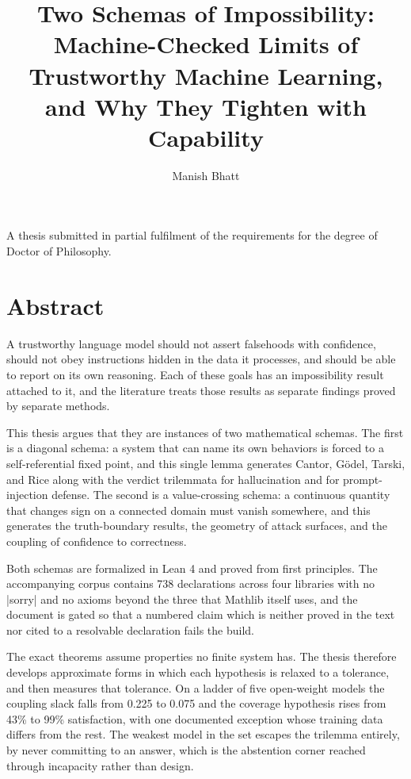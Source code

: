 \documentclass{memoir}
\title{\sffamily Two Schemas of Impossibility: Machine-Checked Limits of Trustworthy Machine Learning, and Why They Tighten with Capability}
\author{\sffamily Manish Bhatt}
\date{\sffamily }
\begin{document}
\frontmatter

\begin{titlingpage}
\maketitle
\end{titlingpage}

\tableofcontents


\cleardoublepage
A thesis submitted in partial fulfilment of the requirements for the degree of
Doctor of Philosophy.

\mainmatter
\chapter{Abstract}\label{Two--Schemas--of--Impossibility-005F-005F-005F--Machine--Checked--Limits--of--Trustworthy--Machine--Learning-005F-005F-005F--and--Why--They--Tighten--with--Capability----Abstract}

A trustworthy language model should not assert falsehoods with confidence,
should not obey instructions hidden in the data it processes, and should be able
to report on its own reasoning. Each of these goals has an impossibility result
attached to it, and the literature treats those results as separate findings
proved by separate methods.

This thesis argues that they are instances of two mathematical schemas. The
first is a diagonal schema: a system that can name its own behaviors is forced
to a self-referential fixed point, and this single lemma generates Cantor,
Gödel, Tarski, and Rice along with the verdict trilemmata for hallucination and
for prompt-injection defense. The second is a value-crossing schema: a
continuous quantity that changes sign on a connected domain must vanish
somewhere, and this generates the truth-boundary results, the geometry of attack
surfaces, and the coupling of confidence to correctness.

Both schemas are formalized in Lean 4 and proved from first principles. The
accompanying corpus contains 738 declarations across four libraries with no
\LeanVerb|sorry| and no axioms beyond the three that Mathlib itself uses, and the
document is gated so that a numbered claim which is neither proved in the text
nor cited to a resolvable declaration fails the build.

The exact theorems assume properties no finite system has. The thesis therefore
develops approximate forms in which each hypothesis is relaxed to a tolerance,
and then measures that tolerance. On a ladder of five open-weight models the
coupling slack falls from 0.225 to 0.075 and the coverage hypothesis rises from
43\% to 99\% satisfaction, with one documented exception whose training data
differs from the rest. The weakest model in the set escapes the trilemma
entirely, by never committing to an answer, which is the abstention corner
reached through incapacity rather than design.
\end{document}
